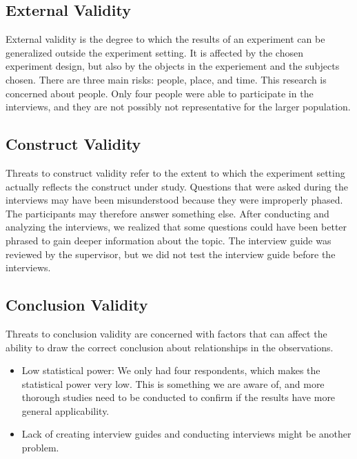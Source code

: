 \subsection{External Validity}
External validity is the degree to which the results of an experiment can be generalized outside the experiment setting. It is affected by the chosen experiment design, but also by the objects in the experiement and the subjects chosen. There are three main risks: people, place, and time. This research is concerned about people. Only four people were able to participate in the interviews, and they are not possibly not representative for the larger population.

\subsection{Construct Validity}
Threats to construct validity refer to the extent to which the experiment setting actually reflects the construct under study. Questions that were asked during the interviews may have been misunderstood because they were improperly phased. The participants may therefore answer something else. After conducting and analyzing the interviews, we realized that some questions could have been better phrased to gain deeper information about the topic. The interview guide was reviewed by the supervisor, but we did not test the interview guide before the interviews.

\subsection{Conclusion Validity}
Threats to conclusion validity are concerned with factors that can affect the ability to draw the correct conclusion about relationships in the observations\cite{Wohlin:2000:ESE:330775}. 

\begin{itemize}
\item Low statistical power: We only had four respondents, which makes the statistical power very low. This is something we are aware of, and more thorough studies need to be conducted to confirm if the results have more general applicability.

\item Lack of creating interview guides and conducting interviews might be another problem.
\end{itemize}





